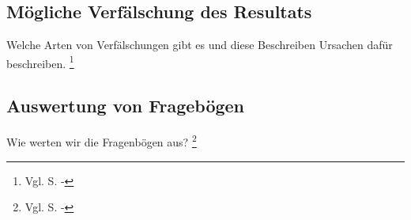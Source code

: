 \subsection{Mögliche Verfälschung des Resultats}
Welche Arten von Verfälschungen gibt es und diese Beschreiben
Ursachen dafür beschreiben. \footnote{Vgl. \cite{Buehner} S. -}

\subsection{Auswertung von Fragebögen}
Wie werten wir die Fragenbögen aus? \footnote{Vgl. \cite{Mayer} S. -}

